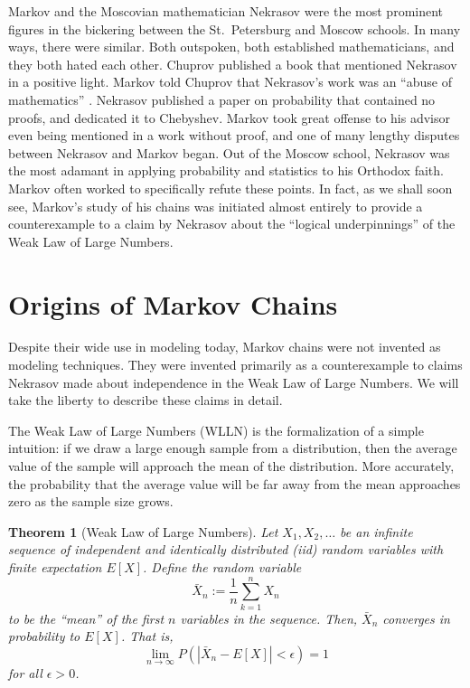 \documentclass[12pt]{article}
\newtheorem{thm}{Theorem}
\theoremstyle{definition}
\begin{document}
Markov and the Moscovian mathematician Nekrasov were the most prominent figures
in the bickering between the St.~Petersburg and Moscow schools. In many ways,
there were similar. Both outspoken, both established mathematicians, and they
both hated each other. Chuprov published a book that mentioned Nekrasov in a
positive light. Markov told Chuprov that Nekrasov's work was an ``abuse of
mathematics'' \citep[p.~257]{seneta1996markov}. Nekrasov published a paper on
probability that contained no proofs, and dedicated it to Chebyshev. Markov
took great offense to his advisor even being mentioned in a work without proof,
and one of many lengthy disputes between Nekrasov and Markov began. Out of the
Moscow school, Nekrasov was the most adamant in applying probability and
statistics to his Orthodox faith. Markov often worked to specifically refute
these points. In fact, as we shall soon see, Markov's study of his chains was
initiated almost entirely to provide a counterexample to a claim by Nekrasov
about the ``logical underpinnings'' of the Weak Law of Large Numbers.

\section{Origins of Markov Chains}
\label{sec:origins_of_markov_chains}

Despite their wide use in modeling today, Markov chains were not invented as
modeling techniques. They were invented primarily as a counterexample to claims
Nekrasov made about independence in the Weak Law of Large Numbers. We will take
the liberty to describe these claims in detail.

The Weak Law of Large Numbers (WLLN) is the formalization of a simple
intuition: if we draw a large enough sample from a distribution, then the
average value of the sample will approach the mean of the distribution. More
accurately, the probability that the average value will be far away from the
mean approaches zero as the sample size grows.

\begin{thm}[Weak Law of Large Numbers]
    \label{thm:WLLN}
    Let $X_1, X_2, \dots$ be an infinite sequence of independent and
    identically distributed (iid) random variables with finite expectation
    $E[X]$. Define the random variable $$\bar{X}_n := \frac{1}{n} \sum_{k =
    1}^n X_n$$ to be the ``mean'' of the first $n$ variables in the
    sequence. Then, $\bar{X}_n$ converges in probability to $E[X]$. That is,
    $$\lim_{n \to \infty} P(|\bar{X}_n - E[X]| < \epsilon) = 1$$ for all
    $\epsilon > 0$.
\end{thm}
\end{document}
